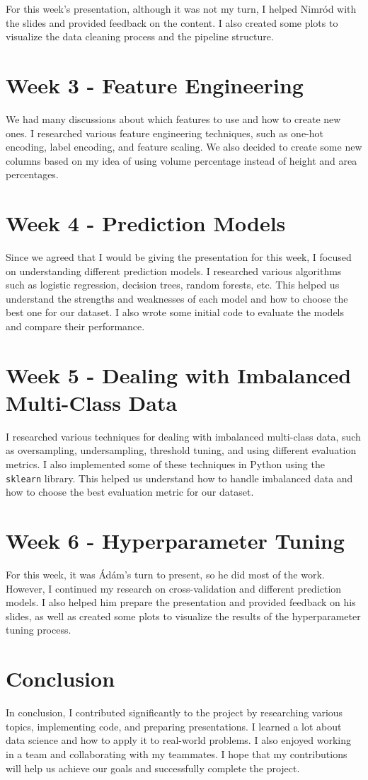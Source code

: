\documentclass[a4paper,12pt]{article}
\begin{document}
For this week's presentation, although it was not my turn, I helped Nimród with the slides and provided feedback on the content. I also created some plots to visualize the data cleaning process and the pipeline structure.

\section{Week 3 - Feature Engineering}
We had many discussions about which features to use and how to create new ones. I researched various feature engineering techniques, such as one-hot encoding, label encoding, and feature scaling. We also decided to create some new columns based on my idea of using volume percentage instead of height and area percentages.

\section{Week 4 - Prediction Models}
Since we agreed that I would be giving the presentation for this week, I focused on understanding different prediction models. I researched various algorithms such as logistic regression, decision trees, random forests, etc.  
This helped us understand the strengths and weaknesses of each model and how to choose the best one for our dataset. I also wrote some initial code to evaluate the models and compare their performance.

\section{Week 5 - Dealing with Imbalanced Multi-Class Data}
I researched various techniques for dealing with imbalanced multi-class data, such as oversampling, undersampling, threshold tuning, and using different evaluation metrics. I also implemented some of these techniques in Python using the \texttt{sklearn} library.  
This helped us understand how to handle imbalanced data and how to choose the best evaluation metric for our dataset.

\section{Week 6 - Hyperparameter Tuning}
For this week, it was Ádám's turn to present, so he did most of the work. However, I continued my research on cross-validation and different prediction models. I also helped him prepare the presentation and provided feedback on his slides, as well as created some plots to visualize the results of the hyperparameter tuning process.

\section{Conclusion}
In conclusion, I contributed significantly to the project by researching various topics, implementing code, and preparing presentations. I learned a lot about data science and how to apply it to real-world problems. I also enjoyed working in a team and collaborating with my teammates. I hope that my contributions will help us achieve our goals and successfully complete the project.

%
%
\end{document}
